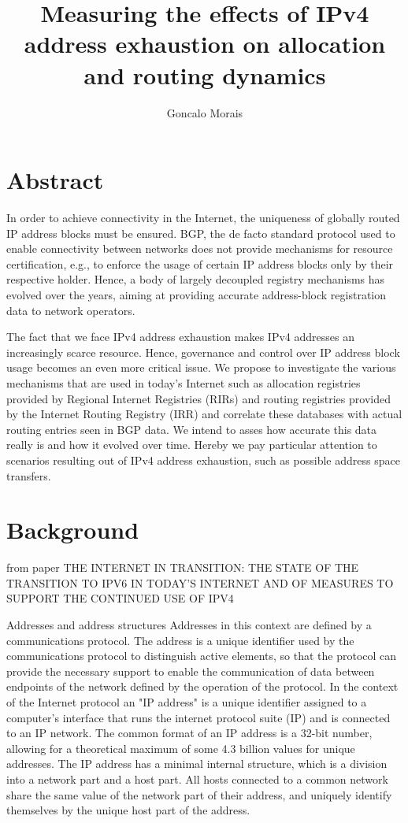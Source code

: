 \documentclass[11pt,a4paper]{scrreprt}
\title{\textbf{Measuring the effects of IPv4 address exhaustion on allocation and routing dynamics}}
\author{Goncalo Morais}
\date{}
\begin{document}
\maketitle

\tableofcontents
\listoffigures
\listoftables

\setcounter{chapter}{0}


\chapter*{Abstract}
In order to achieve connectivity in the Internet, the uniqueness of
globally routed IP address blocks must be ensured. BGP, the de facto
standard protocol used to enable connectivity between networks does not
provide mechanisms for resource certification, e.g., to enforce the
usage of certain IP address blocks only by their respective holder.
Hence, a body of largely decoupled registry mechanisms has evolved over
the years, aiming at providing accurate address-block registration data
to network operators.

The fact that we face IPv4 address exhaustion makes IPv4 addresses an
increasingly scarce resource. Hence, governance and control over IP
address block usage becomes an even more critical issue. We propose to
investigate the various mechanisms that are used in today's Internet
such as allocation registries provided by Regional Internet Registries
(RIRs) and routing registries provided by the Internet Routing Registry
(IRR) and correlate these databases with actual routing entries seen in
BGP data. We intend to asses how accurate this data really is and how it
evolved over time. Hereby we pay particular attention to scenarios
resulting out of IPv4 address exhaustion, such as possible address space
transfers.


\chapter{Background}

from paper THE INTERNET IN TRANSITION: THE STATE OF THE TRANSITION TO IPV6 IN
TODAY'S INTERNET AND OF MEASURES TO SUPPORT THE CONTINUED USE OF
IPV4

Addresses and address structures
Addresses in this context are defined by a communications protocol. The address is a unique
identifier used by the communications protocol to distinguish active elements, so that the protocol can
provide the necessary support to enable the communication of data between endpoints of the network
defined by the operation of the protocol.
In the context of the Internet protocol an "IP address" is a unique identifier assigned to a
computer's interface that runs the internet protocol suite (IP) and is connected to an IP network. The
common format of an IP address is a 32-bit number, allowing for a theoretical maximum of some
4.3 billion values for unique addresses.
The IP address has a minimal internal structure, which is a division into a network part and a host
part. All hosts connected to a common network share the same value of the network part of their address,
and uniquely identify themselves by the unique host part of the address.
\end{document}
